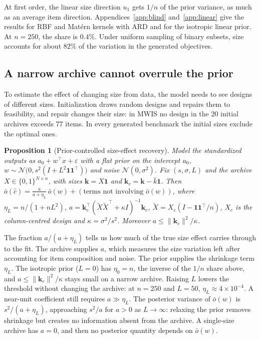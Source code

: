 \documentclass{article}
\newcommand{\revtext}[1]{{\color{blue}#1}}
\providecommand{\one}{\mathbf 1}
\providecommand{\off}{\bar o}
\newtheorem{proposition}{Proposition}
\theoremstyle{remark}\newtheorem{remark}[proposition]{Remark}
\begin{document}
\revtext{At first order, the linear size direction $u_1$ gets $1/n$ of the prior variance, as much as an average item direction. Appendices~\ref{app:blind} and~\ref{app:linear} give the results for RBF and Mat\'ern kernels with ARD and for the isotropic linear prior. At $n=250$, the share is $0.4\%$. Under uniform sampling of binary subsets, size accounts for about $82\%$ of the variation in the generated objectives.}

\subsection{A narrow archive cannot overrule the prior}\label{sec:narrow}

\revtext{To estimate the effect of changing size from data, the model needs to see designs of different sizes.} Initialization draws random designs and repairs them to feasibility, and repair
changes their size: in MWIS no design in the $20$ initial archives exceeds $77$
items. In every generated benchmark the initial sizes exclude the optimal ones.

\begin{proposition}[Prior-controlled size-effect recovery]\label{prop:gain}
Model the standardized outputs as $a_0+w^\top x+\varepsilon$ with a flat prior on
the intercept $a_0$, $w\sim\mathcal N\bigl(0,s^2(I+L^2\one\one^\top)\bigr)$ and
noise $\mathcal N(0,\sigma^2)$. Fix $(s,\sigma,L)$ and the archive
$X\in\{0,1\}^{N\times n}$, with sizes $\mathbf k=X\one$ and
$\mathbf k_c=\mathbf k-\bar k\one$. Then
$\off(\hat c)=\tfrac{a}{a+\eta_L}\,\off(w)+(\text{terms not involving }\off(w))$,
where $\eta_L=n/(1+nL^2)$,
$a=\mathbf k_c^\top(\tilde X\tilde X^\top+\kappa I)^{-1}\mathbf k_c$,
$\tilde X=X_c(I-\one\one^\top/n)$, $X_c$ is the column-centred design and
$\kappa=\sigma^2/s^2$. Moreover $a\le\|\mathbf k_c\|^2/\kappa$.
\end{proposition}

\revtext{The fraction $a/(a+\eta_L)$ tells us how much of the true size effect carries through to the fit. The archive supplies $a$, which measures the size variation left after accounting for item composition and noise. The prior supplies the shrinkage term $\eta_L$.} The isotropic prior ($L=0$) has $\eta_0=n$,
the inverse of the $1/n$ share above, and $a\le\|\mathbf k_c\|^2/\kappa$ stays
small on a narrow archive. Raising $L$ lowers the threshold without changing the
archive: at $n=250$ and $L=50$, $\eta_L\approx4\times10^{-4}$. A near-unit
coefficient still requires $a\gg\eta_L$. The posterior variance of $\off(w)$ is
$s^2/(a+\eta_L)$, approaching $s^2/a$ for $a>0$ as $L\to\infty$: relaxing the
prior removes shrinkage but creates no information absent from the archive. A
single-size archive has $a=0$, and then no posterior quantity depends on $\off(w)$.
\end{document}
